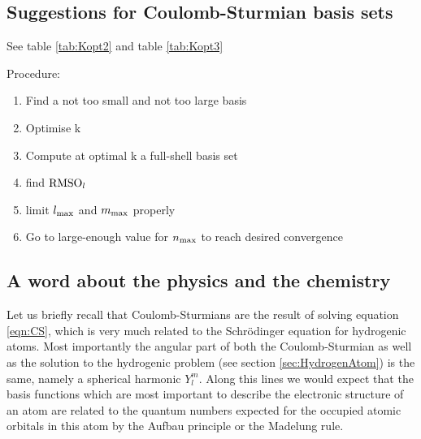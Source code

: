 \subsection{Suggestions for Coulomb-Sturmian basis sets}



See table \vref{tab:Kopt2} and table \vref{tab:Kopt3} %








Procedure:
\begin{enumerate}
	\item Find a not too small and not too large basis
	\item Optimise k
	\item Compute at optimal k a full-shell basis set
	\item find $\text{RMSO}_l$
	\item limit $l_\text{max}$ and $m_\text{max}$ properly
	\item Go to large-enough value for $n_\text{max}$ to reach desired convergence
\end{enumerate}

\subsection{A word about the physics and the chemistry}
Let us briefly recall that Coulomb-Sturmians are the result of
solving equation \eqref{eqn:CS},
which is very much related to the Schrödinger equation for hydrogenic atoms.
Most importantly the angular part of both the Coulomb-Sturmian
as well as the solution to the hydrogenic problem (see section \vref{sec:HydrogenAtom})
is the same, namely a spherical harmonic $Y_l^m$.
Along this lines we would expect that the \CS basis functions
which are most important to describe the electronic structure
of an atom are related to the quantum numbers expected
for the occupied atomic orbitals in this atom by the Aufbau principle
or the Madelung rule.



